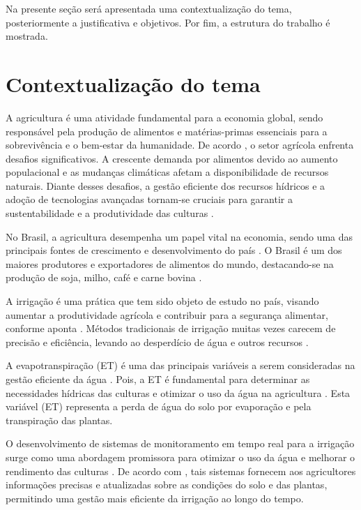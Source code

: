 Na presente seção será apresentada uma contextualização do tema, posteriormente a justificativa e objetivos. Por fim, a estrutura do trabalho é mostrada.

\section{Contextualização do tema}
A agricultura é uma atividade fundamental para a economia global, sendo responsável pela produção de alimentos e matérias-primas essenciais para a sobrevivência e o bem-estar da humanidade. De acordo \textcite{carmody_fao2023}, o setor agrícola enfrenta desafios significativos. A crescente demanda por alimentos devido ao aumento populacional e as mudanças climáticas afetam a disponibilidade de recursos naturais. Diante desses desafios, a gestão eficiente dos recursos hídricos e a adoção de tecnologias avançadas tornam-se cruciais para garantir a sustentabilidade e a produtividade das culturas \parencite{carmody_fao2023}.

No Brasil, a agricultura desempenha um papel vital na economia, sendo uma das principais fontes de crescimento e desenvolvimento do país \parencite{Ramos_irrigacao2022}. O Brasil é um dos maiores produtores e exportadores de alimentos do mundo, destacando-se na produção de soja, milho, café e carne bovina \parencite{Ramos_irrigacao2022}. 

A irrigação é uma prática que tem sido objeto de estudo no país, visando aumentar a produtividade agrícola e contribuir para a segurança alimentar, conforme aponta \textcite{Ramos_irrigacao2022}. Métodos tradicionais de irrigação muitas vezes carecem de precisão e eficiência, levando ao desperdício de água e outros recursos \parencite{Pereira_irrigation2002}.

A evapotranspiração (ET) é uma das principais variáveis a serem consideradas na gestão eficiente da água \parencite{yang_nature2023}. Pois, a ET é fundamental para determinar as necessidades hídricas das culturas e otimizar o uso da água na agricultura \parencite{carmody_fao2023, yang_nature2023}. Esta variável (ET) representa a perda de água do solo por evaporação e pela transpiração das plantas. 

O desenvolvimento de sistemas de monitoramento em tempo real para a irrigação surge como uma abordagem promissora para otimizar o uso da água e melhorar o rendimento das culturas \parencite{Vijh_system2024, Dutta_system2024, Amine_system2024}. De acordo com \textcite{Prathibha_system2017}, tais sistemas fornecem aos agricultores informações precisas e atualizadas sobre as condições do solo e das plantas, permitindo uma gestão mais eficiente da irrigação ao longo do tempo.

